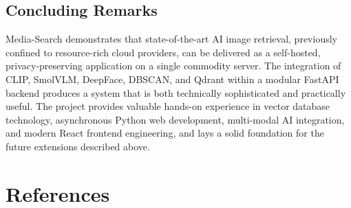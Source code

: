 \documentclass[12pt,a4paper,oneside]{report}
\begin{document}
\section{Concluding Remarks}
Media-Search demonstrates that state-of-the-art AI image retrieval,
previously confined to resource-rich cloud providers, can be
delivered as a self-hosted, privacy-preserving application on a single
commodity server.  The integration of CLIP, SmolVLM, DeepFace, DBSCAN,
and Qdrant within a modular FastAPI backend produces a system that is
both technically sophisticated and practically useful.  The project
provides valuable hands-on experience in vector database technology,
asynchronous Python web development, multi-modal AI integration, and
modern React frontend engineering, and lays a solid foundation for
the future extensions described above.

\chapter*{References}
\end{document}
